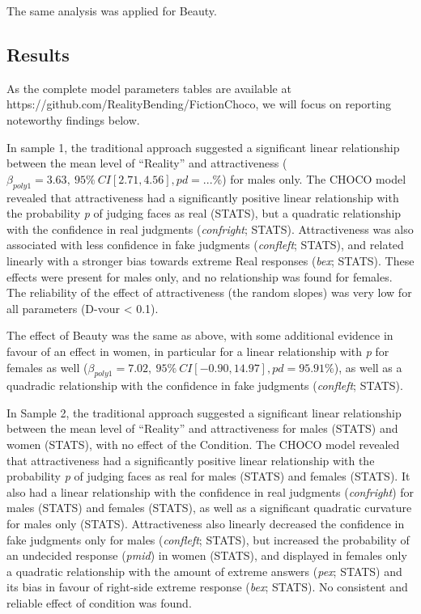 \documentclass[
  jou,
  floatsintext,
  longtable,
  nolmodern,
  notxfonts,
  notimes,
  colorlinks=true,linkcolor=blue,citecolor=blue,urlcolor=blue]{apa7}
\begin{document}
The same analysis was applied for Beauty.

\subsection{Results}\label{results-1}

As the complete model parameters tables are available at
https://github.com/RealityBending/FictionChoco, we will focus on
reporting noteworthy findings below.

In sample 1, the traditional approach suggested a significant linear
relationship between the mean level of ``Reality'' and attractiveness
(\(\beta_{poly1}=3.63, ~95\%~CI [2.71, 4.56], pd = ...\%\)) for males
only. The CHOCO model revealed that attractiveness had a significantly
positive linear relationship with the probability \emph{p} of judging
faces as real (STATS), but a quadratic relationship with the confidence
in real judgments (\emph{confright}; STATS). Attractiveness was also
associated with less confidence in fake judgments (\emph{confleft};
STATS), and related linearly with a stronger bias towards extreme Real
responses (\emph{bex}; STATS). These effects were present for males
only, and no relationship was found for females. The reliability of the
effect of attractiveness (the random slopes) was very low for all
parameters (D-vour \textless{} 0.1).

The effect of Beauty was the same as above, with some additional
evidence in favour of an effect in women, in particular for a linear
relationship with \emph{p} for females as well
(\(\beta_{poly1}=7.02, ~95\%~CI [-0.90, 14.97], pd = 95.91\%\)), as well
as a quadradic relationship with the confidence in fake judgments
(\emph{confleft}; STATS).

In Sample 2, the traditional approach suggested a significant linear
relationship between the mean level of ``Reality'' and attractiveness
for males (STATS) and women (STATS), with no effect of the Condition.
The CHOCO model revealed that attractiveness had a significantly
positive linear relationship with the probability \emph{p} of judging
faces as real for males (STATS) and females (STATS). It also had a
linear relationship with the confidence in real judgments
(\emph{confright}) for males (STATS) and females (STATS), as well as a
significant quadratic curvature for males only (STATS). Attractiveness
also linearly decreased the confidence in fake judgments only for males
(\emph{confleft}; STATS), but increased the probability of an undecided
response (\emph{pmid}) in women (STATS), and displayed in females only a
quadratic relationship with the amount of extreme answers (\emph{pex};
STATS) and its bias in favour of right-side extreme response
(\emph{bex}; STATS). No consistent and reliable effect of condition was
found.
\end{document}
